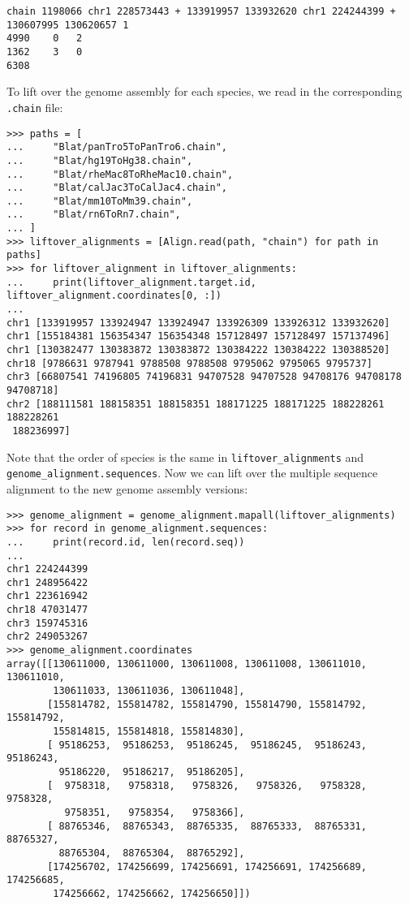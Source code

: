 \begin{verbatim}
chain 1198066 chr1 228573443 + 133919957 133932620 chr1 224244399 + 130607995 130620657 1
4990	0	2
1362	3	0
6308

\end{verbatim}
To lift over the genome assembly for each species, we read in the corresponding \verb+.chain+ file:
\begin{verbatim}
>>> paths = [
...     "Blat/panTro5ToPanTro6.chain",
...     "Blat/hg19ToHg38.chain",
...     "Blat/rheMac8ToRheMac10.chain",
...     "Blat/calJac3ToCalJac4.chain",
...     "Blat/mm10ToMm39.chain",
...     "Blat/rn6ToRn7.chain",
... ]
>>> liftover_alignments = [Align.read(path, "chain") for path in paths]
>>> for liftover_alignment in liftover_alignments:
...     print(liftover_alignment.target.id, liftover_alignment.coordinates[0, :])
...
chr1 [133919957 133924947 133924947 133926309 133926312 133932620]
chr1 [155184381 156354347 156354348 157128497 157128497 157137496]
chr1 [130382477 130383872 130383872 130384222 130384222 130388520]
chr18 [9786631 9787941 9788508 9788508 9795062 9795065 9795737]
chr3 [66807541 74196805 74196831 94707528 94707528 94708176 94708178 94708718]
chr2 [188111581 188158351 188158351 188171225 188171225 188228261 188228261
 188236997]
\end{verbatim}
Note that the order of species is the same in \verb+liftover_alignments+ and \verb+genome_alignment.sequences+. Now we can lift over the multiple sequence alignment to the new genome assembly versions:
\begin{verbatim}
>>> genome_alignment = genome_alignment.mapall(liftover_alignments)
>>> for record in genome_alignment.sequences:
...     print(record.id, len(record.seq))
...
chr1 224244399
chr1 248956422
chr1 223616942
chr18 47031477
chr3 159745316
chr2 249053267
>>> genome_alignment.coordinates
array([[130611000, 130611000, 130611008, 130611008, 130611010, 130611010,
        130611033, 130611036, 130611048],
       [155814782, 155814782, 155814790, 155814790, 155814792, 155814792,
        155814815, 155814818, 155814830],
       [ 95186253,  95186253,  95186245,  95186245,  95186243,  95186243,
         95186220,  95186217,  95186205],
       [  9758318,   9758318,   9758326,   9758326,   9758328,   9758328,
          9758351,   9758354,   9758366],
       [ 88765346,  88765343,  88765335,  88765333,  88765331,  88765327,
         88765304,  88765304,  88765292],
       [174256702, 174256699, 174256691, 174256691, 174256689, 174256685,
        174256662, 174256662, 174256650]])
\end{verbatim}
